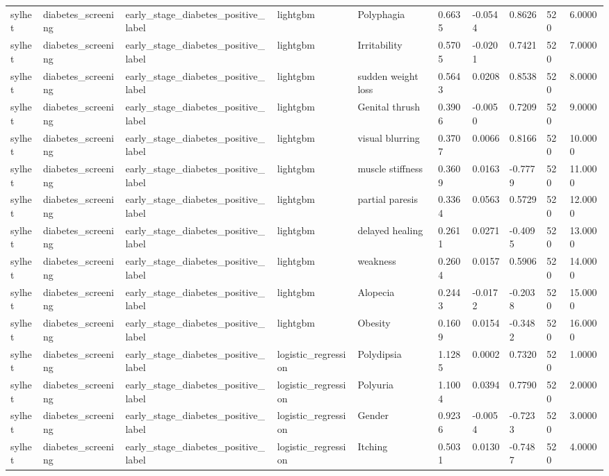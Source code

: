 \begin{tabular}{llllllllll}
sylhet & diabetes\_screening & early\_stage\_diabetes\_positive\_label & lightgbm & Polyphagia & 0.6635 & -0.0544 & 0.8626 & 520 & 6.0000 \\
sylhet & diabetes\_screening & early\_stage\_diabetes\_positive\_label & lightgbm & Irritability & 0.5705 & -0.0201 & 0.7421 & 520 & 7.0000 \\
sylhet & diabetes\_screening & early\_stage\_diabetes\_positive\_label & lightgbm & sudden weight loss & 0.5643 & 0.0208 & 0.8538 & 520 & 8.0000 \\
sylhet & diabetes\_screening & early\_stage\_diabetes\_positive\_label & lightgbm & Genital thrush & 0.3906 & -0.0050 & 0.7209 & 520 & 9.0000 \\
sylhet & diabetes\_screening & early\_stage\_diabetes\_positive\_label & lightgbm & visual blurring & 0.3707 & 0.0066 & 0.8166 & 520 & 10.0000 \\
sylhet & diabetes\_screening & early\_stage\_diabetes\_positive\_label & lightgbm & muscle stiffness & 0.3609 & 0.0163 & -0.7779 & 520 & 11.0000 \\
sylhet & diabetes\_screening & early\_stage\_diabetes\_positive\_label & lightgbm & partial paresis & 0.3364 & 0.0563 & 0.5729 & 520 & 12.0000 \\
sylhet & diabetes\_screening & early\_stage\_diabetes\_positive\_label & lightgbm & delayed healing & 0.2611 & 0.0271 & -0.4095 & 520 & 13.0000 \\
sylhet & diabetes\_screening & early\_stage\_diabetes\_positive\_label & lightgbm & weakness & 0.2604 & 0.0157 & 0.5906 & 520 & 14.0000 \\
sylhet & diabetes\_screening & early\_stage\_diabetes\_positive\_label & lightgbm & Alopecia & 0.2443 & -0.0172 & -0.2038 & 520 & 15.0000 \\
sylhet & diabetes\_screening & early\_stage\_diabetes\_positive\_label & lightgbm & Obesity & 0.1609 & 0.0154 & -0.3482 & 520 & 16.0000 \\
sylhet & diabetes\_screening & early\_stage\_diabetes\_positive\_label & logistic\_regression & Polydipsia & 1.1285 & 0.0002 & 0.7320 & 520 & 1.0000 \\
sylhet & diabetes\_screening & early\_stage\_diabetes\_positive\_label & logistic\_regression & Polyuria & 1.1004 & 0.0394 & 0.7790 & 520 & 2.0000 \\
sylhet & diabetes\_screening & early\_stage\_diabetes\_positive\_label & logistic\_regression & Gender & 0.9236 & -0.0054 & -0.7233 & 520 & 3.0000 \\
sylhet & diabetes\_screening & early\_stage\_diabetes\_positive\_label & logistic\_regression & Itching & 0.5031 & 0.0130 & -0.7487 & 520 & 4.0000 \\

\end{tabular}
